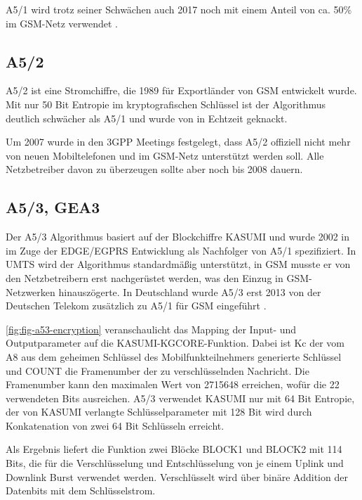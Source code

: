 A5/1 wird trotz seiner Schwächen auch 2017 noch mit einem Anteil von ca. 50\% im \ac{GSM}-Netz verwendet \citep{gsmmap:secrep-ger}. 

\subsection{A5/2}

A5/2 ist eine Stromchiffre, die 1989 für Exportländer von \ac{GSM} entwickelt wurde. Mit nur 50 Bit Entropie im kryptografischen Schlüssel ist der Algorithmus deutlich schwächer als A5/1 und wurde von \citet{barkan2003instant} in Echtzeit geknackt.

Um 2007 wurde in den \ac{3GPP} Meetings festgelegt, dass A5/2 offiziell nicht mehr von neuen Mobiltelefonen und im \ac{GSM}-Netz unterstützt werden soll. Alle Netzbetreiber davon zu überzeugen sollte aber noch bis 2008 dauern. \citep{osmocom:withdrawal-a52}

\subsection{A5/3, GEA3}

Der A5/3 Algorithmus basiert auf der Blockchiffre KASUMI  und wurde 2002 in  im Zuge der \ac{EDGE}/\ac{EGPRS} Entwicklung als Nachfolger von A5/1 spezifiziert. In \ac{UMTS} wird der Algorithmus standardmäßig unterstützt, in \ac{GSM} musste er von den Netzbetreibern erst nachgerüstet werden, was den Einzug in \ac{GSM}-Netzwerken hinauszögerte. In Deutschland wurde A5/3 erst 2013 von der Deutschen Telekom zusätzlich zu A5/1 für \ac{GSM} eingeführt \citep{telekom:a53-gsm}.

\autoref{fig:fig-a53-encryption} veranschaulicht das Mapping der Input- und Outputparameter auf die KASUMI-KGCORE-Funktion. Dabei ist \ac{Kc} der vom \ac{A8} aus dem geheimen Schlüssel des Mobilfunkteilnehmers generierte Schlüssel und COUNT die Framenumber der zu verschlüsselnden Nachricht. Die Framenumber kann den maximalen Wert von 2715648 erreichen, wofür die 22 verwendeten Bits ausreichen. A5/3 verwendet KASUMI nur mit 64 Bit Entropie, der von KASUMI verlangte Schlüsselparameter mit 128 Bit wird durch Konkatenation von zwei 64 Bit Schlüsseln erreicht.

Als Ergebnis liefert die Funktion zwei Blöcke BLOCK1 und BLOCK2 mit 114 Bits, die für die Verschlüsselung und Entschlüsselung von je einem Uplink und Downlink Burst verwendet werden. Verschlüsselt wird über binäre Addition der Datenbits mit dem Schlüsselstrom.


